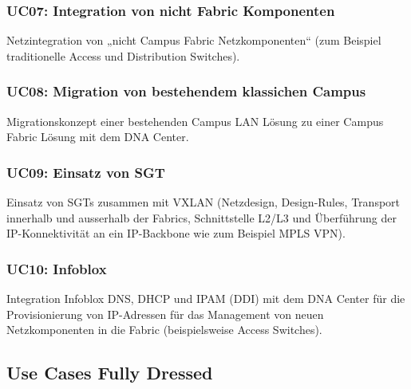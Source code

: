 \subsubsection{UC07: Integration von nicht Fabric Komponenten}
Netzintegration von „nicht Campus Fabric Netzkomponenten“ (zum Beispiel traditionelle Access und Distribution Switches).

\subsubsection{UC08:  Migration von bestehendem klassichen Campus}
Migrationskonzept einer bestehenden Campus LAN Lösung zu einer Campus Fabric Lösung mit dem DNA Center.

\subsubsection{UC09: Einsatz von SGT}
Einsatz von SGTs zusammen mit VXLAN (Netzdesign, Design-Rules, Transport innerhalb und ausserhalb der Fabrics, Schnittstelle L2/L3 und Überführung der IP-Konnektivität an ein IP-Backbone wie zum Beispiel MPLS VPN).

\subsubsection{UC10: Infoblox}
Integration Infoblox DNS, DHCP und IPAM (DDI) mit dem DNA Center für die Provisionierung von IP-Adressen für das Management von neuen Netzkomponenten in die Fabric (beispielsweise Access Switches).

\subsection{Use Cases Fully Dressed}
